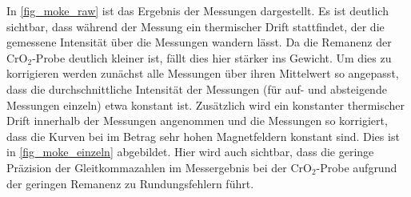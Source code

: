   In \cref{fig_moke_raw} ist das Ergebnis der Messungen dargestellt.
  Es ist deutlich sichtbar, dass während der Messung ein thermischer Drift stattfindet, der die gemessene Intensität über die Messungen wandern lässt.
  Da die Remanenz der CrO$_2$-Probe deutlich kleiner ist, fällt dies hier stärker ins Gewicht.
  Um dies zu korrigieren werden zunächst alle Messungen über ihren Mittelwert so angepasst, dass die durchschnittliche Intensität der Messungen (für auf- und absteigende Messungen einzeln) etwa konstant ist.
  Zusätzlich wird ein konstanter thermischer Drift innerhalb der Messungen angenommen und die Messungen so korrigiert, dass die Kurven bei im Betrag sehr hohen Magnetfeldern konstant sind.
  Dies ist in \cref{fig_moke_einzeln} abgebildet.
  Hier wird auch sichtbar, dass die geringe Präzision der Gleitkommazahlen im Messergebnis bei der CrO$_2$-Probe aufgrund der geringen Remanenz zu Rundungsfehlern führt. %

